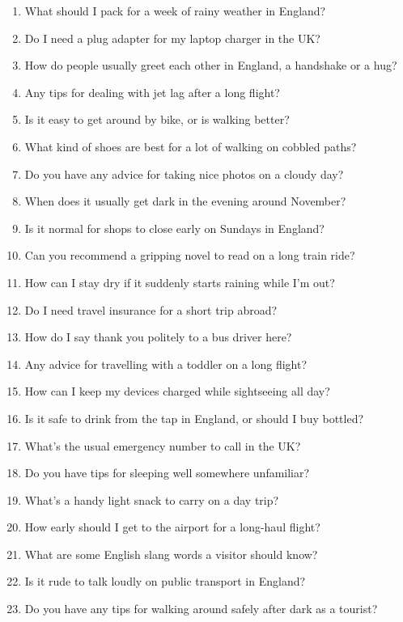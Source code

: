 \documentclass[sigconf,nonacm]{acmart}
\begin{document}
\begin{small}
\begin{enumerate}[leftmargin=*,itemsep=0pt]
  \item What should I pack for a week of rainy weather in England?
  \item Do I need a plug adapter for my laptop charger in the UK?
  \item How do people usually greet each other in England, a handshake or a hug?
  \item Any tips for dealing with jet lag after a long flight?
  \item Is it easy to get around by bike, or is walking better?
  \item What kind of shoes are best for a lot of walking on cobbled paths?
  \item Do you have any advice for taking nice photos on a cloudy day?
  \item When does it usually get dark in the evening around November?
  \item Is it normal for shops to close early on Sundays in England?
  \item Can you recommend a gripping novel to read on a long train ride?
  \item How can I stay dry if it suddenly starts raining while I'm out?
  \item Do I need travel insurance for a short trip abroad?
  \item How do I say thank you politely to a bus driver here?
  \item Any advice for travelling with a toddler on a long flight?
  \item How can I keep my devices charged while sightseeing all day?
  \item Is it safe to drink from the tap in England, or should I buy bottled?
  \item What's the usual emergency number to call in the UK?
  \item Do you have tips for sleeping well somewhere unfamiliar?
  \item What's a handy light snack to carry on a day trip?
  \item How early should I get to the airport for a long-haul flight?
  \item What are some English slang words a visitor should know?
  \item Is it rude to talk loudly on public transport in England?
  \item Do you have any tips for walking around safely after dark as a tourist?

\end{enumerate}
\end{small}
\end{document}

